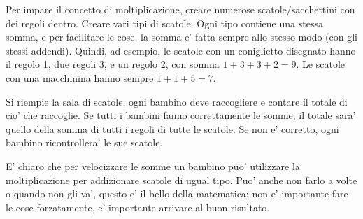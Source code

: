 \documentclass[a4paper]{article}
\begin{document}
Per impare il concetto di moltiplicazione, creare numerose scatole/sacchettini con dei regoli dentro. Creare vari tipi di scatole. Ogni tipo contiene una stessa somma, e per facilitare le cose, la somma e' fatta sempre allo stesso modo (con gli stessi addendi). Quindi, ad esempio, le scatole con un coniglietto disegnato hanno il regolo 1, due regoli 3, e un regolo 2, con somma $1+3+3+2=9$. Le scatole con una macchinina hanno sempre $1+1+5=7$.

Si riempie la sala di scatole, ogni bambino deve raccogliere e contare il totale di cio' che raccoglie. Se tutti i bambini fanno correttamente le somme, il totale sara' quello della somma di tutti i regoli di tutte le scatole. Se non e' corretto, ogni bambino ricontrollera' le sue scatole. 

E' chiaro che per velocizzare le somme un bambino puo' utilizzare la moltiplicazione per addizionare scatole di ugual tipo. Puo' anche non farlo a volte o quando non gli va', questo e' il bello della matematica: non e' importante fare le cose forzatamente, e' importante arrivare al buon risultato.



\printindex
\end{document}

